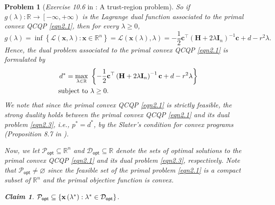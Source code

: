 \documentclass[11pt]{article}
\newtheorem{claim}{\sf Claim}
\newtheorem{problem}{Problem}
\numberwithin{equation}{problem}
\begin{document}
\begin{problem} [\emph{Exercise 10.6} in \cite{calafiore2014optimization}: A trust-region problem]
{So if $g(\lambda) : \mathbb{R} \rightarrow \left[ - \infty, +\infty \right)$ is the Lagrange dual function associated to the primal convex QCQP \eqref{eqn2.1}, then for every $\lambda \geq 0$,
\begin{equation*}
    g(\lambda) = \inf \left\{ \mathcal{L} \left( \mathbf{x}, \lambda \right) : \mathbf{x} \in \mathbb{R}^n \right\}
    = \mathcal{L} \left( \mathbf{x} (\lambda), \lambda \right)
    = - \frac{1}{2} \mathbf{c}^{\top} \left( \mathbf{H} + 2 \lambda \mathbf{I}_n \right)^{-1} \mathbf{c} + d - r^2 \lambda.
\end{equation*}
Hence, the dual problem associated to the primal convex QCQP \eqref{eqn2.1} is formulated by
\begin{equation}
    \label{eqn2.3}
    \begin{split}
        d^* = \max_{\lambda \in \mathbb{R}} \ & \left\{  - \frac{1}{2} \mathbf{c}^{\top} \left( \mathbf{H} + 2 \lambda \mathbf{I}_n \right)^{-1} \mathbf{c} + d - r^2 \lambda \right\} \\
        \textnormal{subject to } & \lambda \geq 0.
    \end{split}
\end{equation}
We note that since the primal convex QCQP \eqref{eqn2.1} is strictly feasible, the strong duality holds between the primal convex QCQP \eqref{eqn2.1} and its dual problem \eqref{eqn2.3}, \emph{i.e.}, $p^* = d^*$, by the Slater's condition for convex programs (\emph{Proposition 8.7} in \cite{calafiore2014optimization}). 
\medskip

\indent Now, we let $\mathcal{P}_{\textsf{opt}} \subseteq \mathbb{R}^n$ and $\mathcal{D}_{\textsf{opt}} \subseteq \mathbb{R}$ denote the sets of optimal solutions to the primal convex QCQP \eqref{eqn2.1} and its dual problem \eqref{eqn2.3}, respectively. Note that $\mathcal{P}_{\textsf{opt}} \neq \varnothing$ since the feasible set of the primal problem \eqref{eqn2.1} is a compact subset of $\mathbb{R}^n$ and the primal objective function is convex. 

\begin{claim}
\label{claim2.1}
$\mathcal{P}_{\textnormal{\textsf{opt}}} \subseteq \left\{ \mathbf{x} \left( \lambda^* \right) : \lambda^* \in \mathcal{D}_{\textnormal{\textsf{opt}}} \right\}$.
\end{claim}

}
\end{problem}
\end{document}
